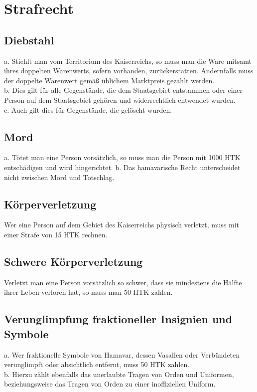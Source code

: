 \documentclass{article}
\begin{document}
\section{Strafrecht}
\subsection{Diebstahl}
a. Stiehlt man vom Territorium des Kaiserreichs, so muss man die Ware mitsamt ihres doppelten Warenwerts, sofern vorhanden, zurückerstatten. Andernfalls muss der doppelte Warenwert gemäß üblichem Marktpreis gezahlt werden.\\
b. Dies gilt für alle Gegenstände, die dem Staatsgebiet entstammen oder einer Person auf dem Staatsgebiet gehören und widerrechtlich entwendet wurden.\\
c. Auch gilt dies für Gegenstände, die gelöscht wurden.

\subsection{Mord}
a. Tötet man eine Person vorsätzlich, so muss man die Person mit 1000 HTK entschädigen und wird hingerichtet.
b. Das hamavarische Recht unterscheidet nicht zwischen Mord und Totschlag.

\subsection{Körperverletzung}
Wer eine Person auf dem Gebiet des Kaiserreichs physisch verletzt, muss mit einer Strafe von 15 HTK rechnen.

\subsection{Schwere Körperverletzung}
Verletzt man eine Person vorsätzlich so schwer, dass sie mindestens die Hälfte ihrer Leben verloren hat, so muss man 50 HTK zahlen.

\subsection{Verunglimpfung fraktioneller Insignien und Symbole}
a. Wer fraktionelle Symbole von Hamavar, dessen Vasallen oder Verbündeten verunglimpft oder absichtlich entfernt, muss 50 HTK zahlen.\\
b. Hierzu zählt ebenfalls das unerlaubte Tragen von Orden und Uniformen, beziehungsweise das Tragen von Orden zu einer inoffiziellen Uniform.
\end{document}
